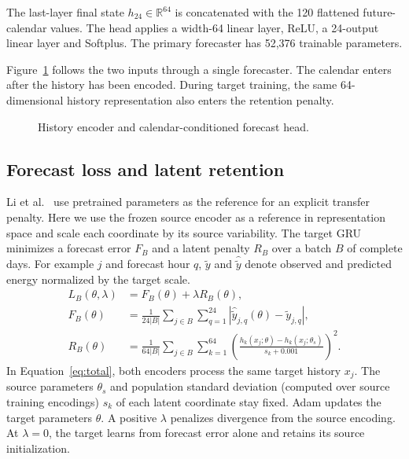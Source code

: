 The last-layer final state $h_{24}\in\mathbb R^{64}$ is concatenated with the 120 flattened future-calendar values. The head applies a width-64 linear layer, ReLU, a 24-output linear layer and Softplus. The primary forecaster has 52,376 trainable parameters.


Figure~\ref{fig:gru-forward} follows the two inputs through a single forecaster. The calendar enters after the history has been encoded. During target training, the same 64-dimensional history representation also enters the retention penalty.
\begin{figure}[htbp]\centering
\resizebox{.95\linewidth}{!}{}
\caption{History encoder and calendar-conditioned forecast head.}\label{fig:gru-forward}
\end{figure}

\subsection{Forecast loss and latent retention}

Li et al.~\cite{li2018} use pretrained parameters as the reference for an explicit transfer penalty. Here we use the frozen source encoder as a reference in representation space and scale each coordinate by its source variability. The target GRU minimizes a forecast error $F_B$ and a latent penalty $R_B$ over a batch $B$ of complete days. For example $j$ and forecast hour $q$, $\widetilde y$ and $\widehat{\widetilde y}$ denote observed and predicted energy normalized by the target scale.
\begin{equation}\begin{aligned}
L_B(\theta,\lambda)&=F_B(\theta)+\lambda R_B(\theta),\\
F_B(\theta)&=\frac{1}{24|B|}\sum_{j\in B}\sum_{q=1}^{24}
|\widehat{\widetilde y}_{j,q}(\theta)-\widetilde y_{j,q}|,\\
R_B(\theta)&=\frac{1}{64|B|}\sum_{j\in B}\sum_{k=1}^{64}
\left(\frac{h_k(x_j;\theta)-h_k(x_j;\theta_s)}{s_k+0.001}\right)^2 .
\end{aligned}\label{eq:total}\end{equation}
In Equation~\eqref{eq:total}, both encoders process the same target history $x_j$. The source parameters $\theta_s$ and population standard deviation (computed over source training encodings) $s_k$ of each latent coordinate stay fixed. Adam updates the target parameters $\theta$. A positive $\lambda$ penalizes divergence from the source encoding. At $\lambda=0$, the target learns from forecast error alone and retains its source initialization.

